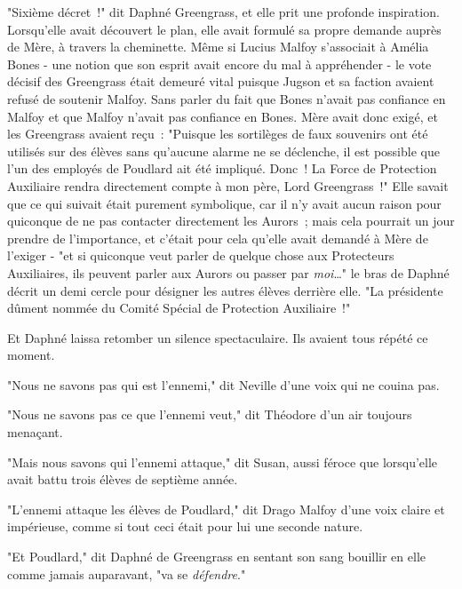 "Sixième décret~!" dit Daphné Greengrass, et elle prit une profonde inspiration. Lorsqu'elle avait découvert le plan, elle avait formulé sa propre demande auprès de Mère, à travers la cheminette. Même si Lucius Malfoy s'associait à Amélia Bones - une notion que son esprit avait encore du mal à appréhender - le vote décisif des Greengrass était demeuré vital puisque Jugson et sa faction avaient refusé de soutenir Malfoy. Sans parler du fait que Bones n'avait pas confiance en Malfoy et que Malfoy n'avait pas confiance en Bones. Mère avait donc exigé, et les Greengrass avaient reçu~: "Puisque les sortilèges de faux souvenirs ont été utilisés sur des élèves sans qu'aucune alarme ne se déclenche, il est possible que l'un des employés de Poudlard ait été impliqué. Donc~! La Force de Protection Auxiliaire rendra directement compte à mon père, Lord Greengrass~!" Elle savait que ce qui suivait était purement symbolique, car il n'y avait aucun raison pour quiconque de ne pas contacter directement les Aurors~; mais cela pourrait un jour prendre de l'importance, et c'était pour cela qu'elle avait demandé à Mère de l'exiger - "et si quiconque veut parler de quelque chose aux Protecteurs Auxiliaires, ils peuvent parler aux Aurors ou passer par \emph{moi}…" le bras de Daphné décrit un demi cercle pour désigner les autres élèves derrière elle. "La présidente dûment nommée du Comité Spécial de Protection Auxiliaire~!"

Et Daphné laissa retomber un silence spectaculaire. Ils avaient tous répété ce moment.

"Nous ne savons pas qui est l'ennemi," dit Neville d'une voix qui ne couina pas.

"Nous ne savons pas ce que l'ennemi veut," dit Théodore d'un air toujours menaçant.

"Mais nous savons qui l'ennemi attaque," dit Susan, aussi féroce que lorsqu'elle avait battu trois élèves de septième année.

"L'ennemi attaque les élèves de Poudlard," dit Drago Malfoy d'une voix claire et impérieuse, comme si tout ceci était pour lui une seconde nature.

"Et Poudlard," dit Daphné de Greengrass en sentant son sang bouillir en elle comme jamais auparavant, "va se \emph{défendre}." 

